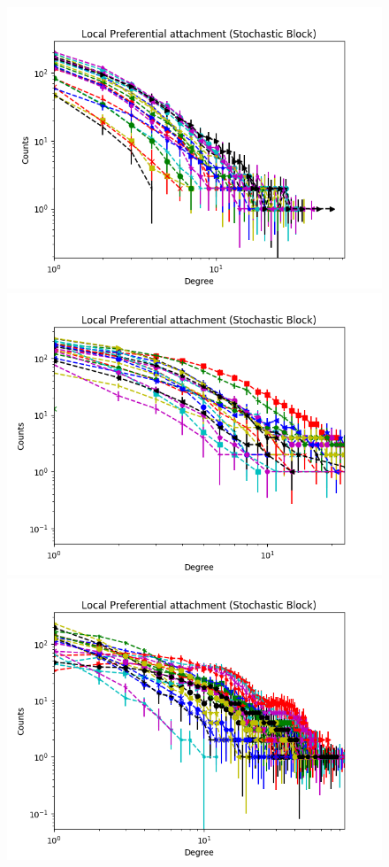 \documentclass[a4paper, 12pt]{article}
\begin{document}
\begin{figure}[ht]
	\endminipage
		\vspace{-0.29cm}
	\includegraphics[scale=0.27]{img/expe/1_ibp/figure_2}
	\endminipage
	\includegraphics[scale=0.27]{img/expe/2_ibp/figure_2} 
	\endminipage
	\includegraphics[scale=0.27]{img/expe/3_ibp/figure_2}

\end{figure}
\end{document}
